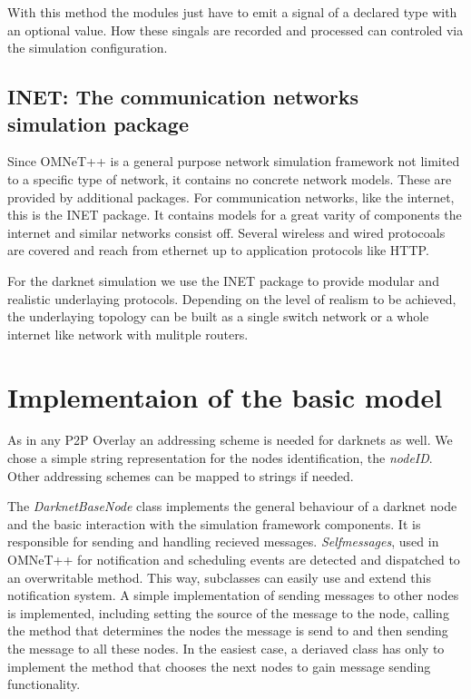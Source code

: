 With this method the modules just have to emit a signal of a declared type with an optional value. How these singals are recorded and processed can controled via the simulation configuration.

\subsection{INET: The communication networks simulation package}

Since OMNeT++ is a general purpose network simulation framework not limited to a specific type of network, it contains no concrete network models. These are provided by additional packages. For communication networks, like the internet, this is the INET package. It contains models for a great varity of components the internet and similar networks consist off. Several wireless and wired protocoals are covered and reach from ethernet up to application protocols like HTTP.

For the darknet simulation we use the INET package to provide modular and realistic underlaying protocols. Depending on the level of realism to be achieved, the underlaying topology can be built as a single switch network or a whole internet like network with mulitple routers.

\section{Implementaion of the basic model}

As in any P2P Overlay an addressing scheme is needed for darknets as well. We chose a simple string representation for the nodes identification, the \emph{nodeID}. Other addressing schemes can be mapped to strings if needed.

The \emph{DarknetBaseNode} class implements the general behaviour of a darknet node and the basic interaction with the simulation framework components. It is responsible for sending and handling recieved messages. \emph{Selfmessages}, used in OMNeT++ for notification and scheduling events are detected and dispatched to an overwritable method. This way, subclasses can easily use and extend this notification system. A simple implementation of sending messages to other nodes is implemented, including setting the source of the message to the node, calling the method that determines the nodes the message is send to and then sending the message to all these nodes. In the easiest case, a deriaved class has only to implement the method that chooses the next nodes to gain message sending functionality.

